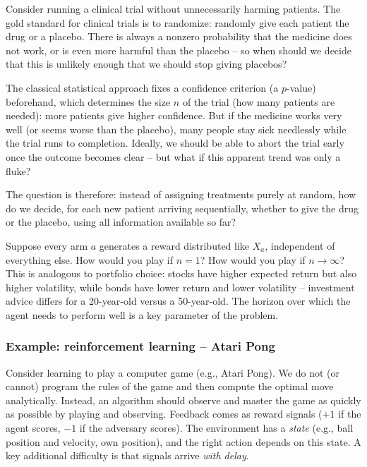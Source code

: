 \begin{example}
Consider running a clinical trial without unnecessarily harming patients. The gold standard for clinical trials is to randomize: randomly give each patient the drug or a placebo. There is always a nonzero probability that the medicine does not work, or is even more harmful than the placebo -- so when should we decide that this is unlikely enough that we should stop giving placebos?

The classical statistical approach fixes a confidence criterion (a $p$-value) beforehand, which determines the size $n$ of the trial (how many patients are needed): more patients give higher confidence. But if the medicine works very well (or seems worse than the placebo), many people stay sick needlessly while the trial runs to completion. Ideally, we should be able to abort the trial early once the outcome becomes clear -- but what if this apparent trend was only a fluke?

The question is therefore: instead of assigning treatments purely at random, how do we decide, for each new patient arriving sequentially, whether to give the drug or the placebo, using all information available so far?
\end{example}

\begin{remark}
Suppose every arm $a$ generates a reward distributed like $X_a$, independent of everything else. How would you play if $n = 1$? How would you play if $n \to \infty$? This is analogous to portfolio choice: stocks have higher expected return but also higher volatility, while bonds have lower return and lower volatility -- investment advice differs for a 20-year-old versus a 50-year-old. The horizon over which the agent needs to perform well is a key parameter of the problem.
\end{remark}

\subsubsection*{Example: reinforcement learning -- Atari Pong}

Consider learning to play a computer game (e.g., Atari Pong). We do not (or cannot) program the rules of the game and then compute the optimal move analytically. Instead, an algorithm should observe and master the game as quickly as possible by playing and observing. Feedback comes as reward signals ($+1$ if the agent scores, $-1$ if the adversary scores). The environment has a \emph{state} (e.g., ball position and velocity, own position), and the right action depends on this state. A key additional difficulty is that signals arrive \emph{with delay}.

